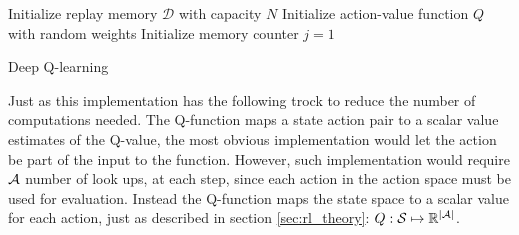 \begin{algorithm}[H]
\SetAlgoLined
 Initialize replay memory $\mathcal{D}$ with capacity $N$\;
 Initialize action-value function $Q$ with random weights\;
 Initialize memory counter $j=1$\;
\caption{Deep Q-learning}
\label{alg:dqlearning}
\end{algorithm}

Just as \parencite{mnih_playing_nodate} this implementation has the following trock to reduce the number of computations needed. The Q-function maps a state action pair to a scalar value estimates of the Q-value, the most obvious implementation would let the action be part of the input to the function. However, such implementation would require $\mathcal{A}$ number of look ups, at each step, since each action in the action space must be used for evaluation. Instead the Q-function maps the state space to a scalar value for each action, just as described in section \ref{sec:rl_theory}: $Q: \mathcal{S} \mapsto \mathbb{R}^{\mid \mathcal{A} \mid}$. 


